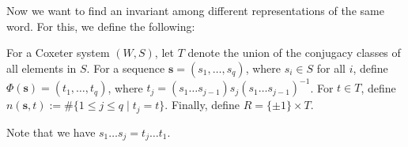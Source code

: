 \documentclass[../main.tex]{subfiles}
\begin{document}
Now we want to find an invariant among different representations of the same word. For this, we define the following:

\begin{definition}
    For a Coxeter system \( (W, S) \), let \( T \) denote the union of the conjugacy classes of all elements in \( S \). For a sequence \( \mathbf{s} = (s_1, \dots, s_q) \), where \( s_i \in S \) for all \( i \), define \( \Phi(\mathbf{s}) = (t_1, \dots, t_q) \), where \( t_j = (s_1 \dots s_{j-1}) s_j (s_1 \dots s_{j-1})^{-1} \). For \( t \in T \), define \( n(\mathbf{s}, t) := \# \{ 1 \le j \le q \mid t_j = t \} \). Finally, define \( R = \{\pm 1\} \times T \).
\end{definition}

Note that we have \( s_1 \dots s_j = t_j \dots t_1 \).
\end{document}
